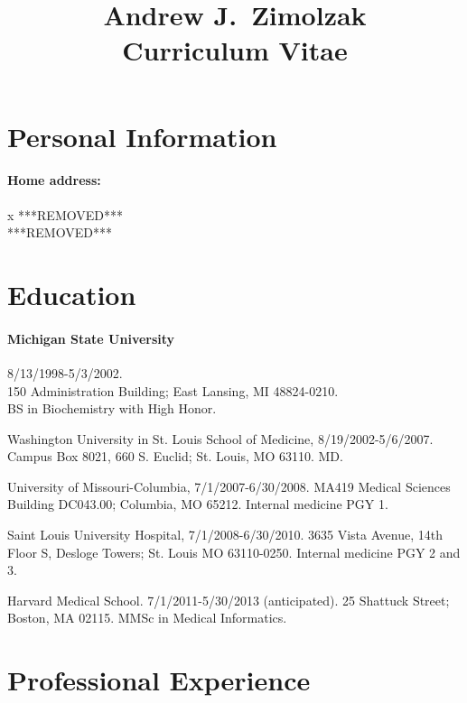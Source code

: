 \documentclass[12pt]{article}
\title{Andrew J.\ Zimolzak\\Curriculum Vitae}
\begin{document}
\maketitle

\section{Personal Information}

\paragraph{Home address:}x \newline
***REMOVED***\\
***REMOVED***

\section{Education}

\paragraph{Michigan State University} 8/13/1998-5/3/2002.\\
150 Administration Building; East Lansing, MI 48824-0210.\\
BS in Biochemistry with High Honor.

Washington University in St. Louis School of Medicine,
8/19/2002-5/6/2007.
Campus Box 8021, 660 S. Euclid; St. Louis, MO 63110.
MD.

University of Missouri-Columbia, 7/1/2007-6/30/2008.
MA419 Medical Sciences Building DC043.00; Columbia, MO 65212.
Internal medicine PGY 1.

Saint Louis University Hospital, 7/1/2008-6/30/2010.
3635 Vista Avenue, 14th Floor S, Desloge Towers; St. Louis MO
63110-0250.
Internal medicine PGY 2 and 3.

Harvard Medical School. 7/1/2011-5/30/2013 (anticipated).
25 Shattuck Street; Boston, MA 02115.
MMSc in Medical Informatics.

\section{Professional Experience}
\end{document}
